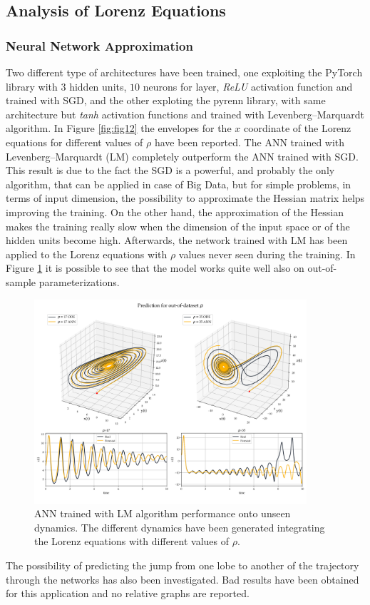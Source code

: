 \documentclass[]{article}
\begin{document}
\subsection{Analysis of Lorenz Equations}
\subsubsection{Neural Network Approximation}
Two different type of architectures have been trained, one exploiting the PyTorch library with $3$ hidden units, $10$ neurons for layer, \textit{ReLU} activation function and trained with SGD, and the other exploting the pyrenn library, with same architecture but \textit{tanh} activation functions and trained with Levenberg–Marquardt algorithm. In Figure \ref{fig:fig12} the envelopes for the $x$ coordinate of the Lorenz equations for different values of $\rho$ have been reported. 
The ANN trained with Levenberg–Marquardt (LM) completely outperform the ANN trained with SGD. This result is due to the fact the SGD is a powerful, and probably the only algorithm, that can be applied in case of Big Data, but for simple problems, in terms of input dimension, the possibility to approximate the Hessian matrix helps improving the training. On the other hand, the approximation of the Hessian makes the training really slow when the dimension of the input space or of the hidden units become high. Afterwards, the network trained with LM has been applied to the Lorenz equations with $\rho$ values never seen during the training. In Figure \ref{fig:fig13} it is possible to see that the model works quite well also on out-of-sample parameterizations.
\begin{figure}[!b]
	\centering
	\includegraphics[width=0.9\textwidth]{../figures/rho_oos.png}
	\caption{ANN trained with LM algorithm performance onto unseen dynamics. The different dynamics have been generated integrating the Lorenz equations with different values of $\rho$.}
	\label{fig:fig13}
\end{figure}
The possibility of predicting the jump from one lobe to another of the trajectory through the networks has also been investigated. Bad results have been obtained for this application and no relative graphs are reported.
\end{document}
